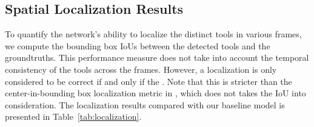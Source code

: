 \documentclass{svjour3}                     \smartqed
\begin{document}
\subsection{Spatial Localization Results}
\label{sec:spatial_localization}
To quantify the network's ability to localize the distinct tools in various frames, we compute the bounding box IoUs between the detected tools and the groundtruths.
This performance measure does not take into account the temporal consistency of the tools across the frames.
However, a localization is only considered to be correct if and only if the .
Note that this is stricter than the center-in-bounding box localization metric in \cite{miccai:vardazaryan2018weakly}, which does not takes the IoU into consideration.
The localization results compared with our baseline model is presented in Table~\ref{tab:localization}. 
\end{document}
